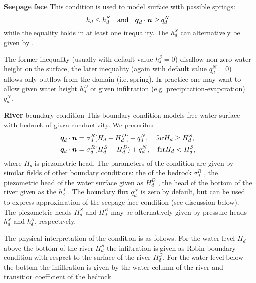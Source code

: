 {\bf Seepage face} This condition is used to model surface with possible springs:
\[
    h_d \le h_d^S\quad \text{and} \quad \mathbf{\boldsymbol{q}}_d \cdot \mathbf{\boldsymbol{n}} \ge q_d^N
\]    
while the equality holds in at least one inequality. The  
$h_d^S$  can alternatively be given by .

The former inequality
(usually with default value $h_d^S=0$) disallow non-zero water height on the surface, the later
inequality (again with default value $q_d^N=0$) allows only outflow from the domain (i.e. spring).
In practice one may want to allow given water height $h_d^D$ or given infiltration (e.g. precipitation-evaporation) $q_d^N$.


{\bf River} boundary condition
This boundary condition models free water surface with bedrock of given conductivity. 
We prescribe:
\begin{align}
  \mathbf{\boldsymbol{q}}_d \cdot \mathbf{\boldsymbol{n}} &= \sigma_d^R ( H_d - H_d^D) + q_d^N, \quad \text{for} H_d \ge H_d^S,\\
  \mathbf{\boldsymbol{q}}_d \cdot \mathbf{\boldsymbol{n}} &= \sigma_d^R ( H_d^S - H_d^D)+q_d^N, \quad \text{for} H_d < H_d^S,
\end{align}
where $H_d$ is piezometric head.
The parameters of the condition are given by similar fields of other boundary conditions: 
the  of the bedrock $\sigma_d^R$ , 
the piezometric head of the water surface given as   $H_d^D$ ,
the head of the bottom of the river given as the  
$h_d^S$ . The boundary flux $q_d^N$ is zero by default, but can be used to express approximation of the seepage face condition 
(see discussion below).  The piezometric heads  $H_d^S$ and $H_d^R$ may be alternatively 
given by pressure heads $h_d^S$ and $h_d^R$, respectively.

The physical interpretation of the condition is as follows. For the water level $H_d$ above the bottom of the river $H_d^S$ the infiltration is given 
as Robin boundary condition with respect to the surface of the river $H_d^D$. 
For the water level below the bottom the infiltration is given by the water column of the river and transition coefficient of the bedrock.

